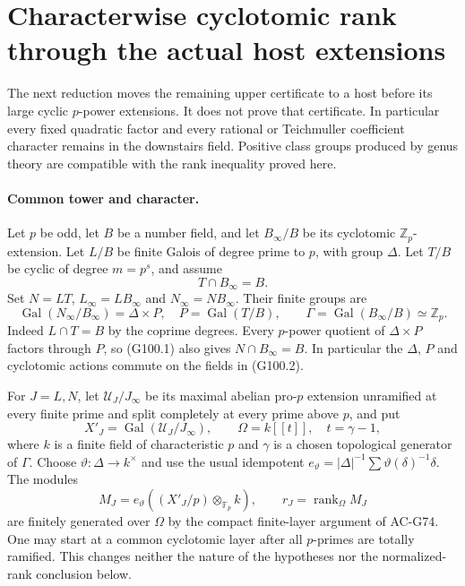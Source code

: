 \section{Characterwise cyclotomic rank through the actual host extensions}
\label{sec:cubic-characterwise-rank-ascent}

The next reduction moves the remaining upper certificate to a host
before its large cyclic $p$-power extensions.  It does not prove that
certificate.  In particular every fixed quadratic factor and every
rational or Teichmuller coefficient character remains in the downstairs
field.  Positive class groups produced by genus theory are compatible
with the rank inequality proved here.

\paragraph{Common tower and character.}
Let $p$ be odd, let $B$ be a number field, and let $B_\infty/B$
be its cyclotomic $\mathbb Z_p$-extension.  Let $L/B$ be finite
Galois of degree prime to $p$, with group $\Delta$.  Let $T/B$
be cyclic of degree $m=p^s$, and assume
\[
                         T\cap B_\infty=B.
 \tag{G100.1}
\]
Set $N=LT$, $L_\infty=LB_\infty$ and $N_\infty=NB_\infty$.
Their finite groups are
\[
 \operatorname{Gal}(N_\infty/B_\infty)=\Delta\times P,
 \quad P=\operatorname{Gal}(T/B),\qquad
 \Gamma=\operatorname{Gal}(B_\infty/B)\simeq\mathbb Z_p.
 \tag{G100.2}
\]
Indeed $L\cap T=B$ by the coprime degrees.  Every $p$-power
quotient of $\Delta\times P$ factors through $P$, so (G100.1)
also gives $N\cap B_\infty=B$.  In particular the
$\Delta$, $P$ and cyclotomic actions commute on the fields in (G100.2).

For $J=L,N$, let $\mathcal U_J/J_\infty$ be its maximal abelian
pro-$p$ extension unramified at every finite prime and split completely
at every prime above $p$, and put
\[
 X'_J=\operatorname{Gal}(\mathcal U_J/J_\infty),\qquad
 \Omega=k[[t]],\quad t=\gamma-1,
 \tag{G100.3}
\]
where $k$ is a finite field of characteristic $p$ and $\gamma$
is a chosen topological generator of $\Gamma$.
Choose $\vartheta:\Delta\to k^\times$ and use the usual
idempotent
$e_\vartheta=|\Delta|^{-1}\sum\vartheta(\delta)^{-1}\delta$.
The modules
\[
 M_J=e_\vartheta((X'_J/p)\otimes_{\mathbb F_p}k),\qquad
 r_J=\operatorname{rank}_\Omega M_J
 \tag{G100.4}
\]
are finitely generated over $\Omega$ by the compact finite-layer
argument of AC-G74.  One may start at a common cyclotomic layer after
all $p$-primes are totally ramified.  This changes neither the nature
of the hypotheses nor the normalized-rank conclusion below.

